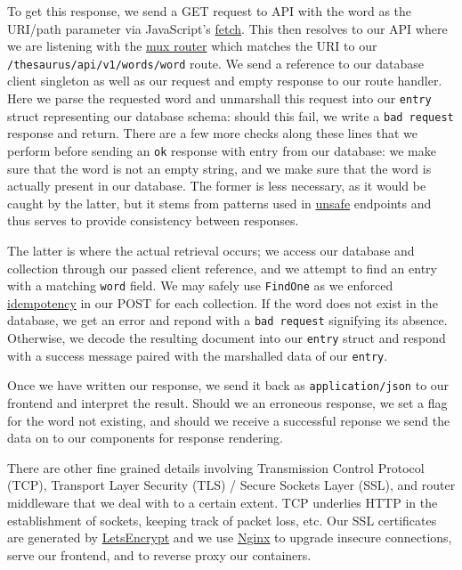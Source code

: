 \documentclass[11pt, twoside, reqno]{book}
\begin{document}
To get this response, we send a GET request to API with the word as the URI/path parameter via JavaScript's \href{https://developer.mozilla.org/en-US/docs/Web/API/Fetch_API}{fetch}. This then resolves to our API where we are listening with the \href{http://www.gorillatoolkit.org/pkg/mux}{mux router} which matches the URI to our \texttt{/thesaurus/api/v1/words/{word}} route. We send a reference to our database client singleton as well as our request and empty response to our route handler. Here we parse the requested word and unmarshall this request into our \texttt{entry} struct representing our database schema: should this fail, we write a \texttt{bad request} response and return. There are a few more checks along these lines that we perform before sending an \texttt{ok} response with entry from our database: we make sure that the word is not an empty string, and we make sure that the word is actually present in our database. The former is less necessary, as it would be caught by the latter, but it stems from patterns used in \href{https://developer.mozilla.org/en-US/docs/Glossary/safe}{unsafe} endpoints and thus serves to provide consistency between responses.

The latter is where the actual retrieval occurs; we access our database and collection through our passed client reference, and we attempt to find an entry with a matching \texttt{word} field. We may safely use \texttt{FindOne} as we enforced \href{https://developer.mozilla.org/en-US/docs/Glossary/idempotent}{idempotency} in our POST for each collection. If the word does not exist in the database, we get an error and repond with a \texttt{bad request} signifying its absence. Otherwise, we decode the resulting document into our \texttt{entry} struct and respond with a success message paired with the marshalled data of our \texttt{entry}.

Once we have written our response, we send it back as \texttt{application/json} to our frontend and interpret the result. Should we an erroneous response, we set a flag for the word not existing, and should we receive a successful reponse we send the data on to our components for response rendering.

There are other fine grained details involving Transmission Control Protocol (TCP), Transport Layer Security (TLS) / Secure Sockets Layer (SSL), and router middleware that we deal with to a certain extent. TCP underlies HTTP in the establishment of sockets, keeping track of packet loss, etc. Our SSL certificates are generated by \href{https://letsencrypt.org/}{LetsEncrypt} and we use \href{https://www.nginx.com}{Nginx} to upgrade insecure connections, serve our frontend, and to reverse proxy our containers.
\end{document}
